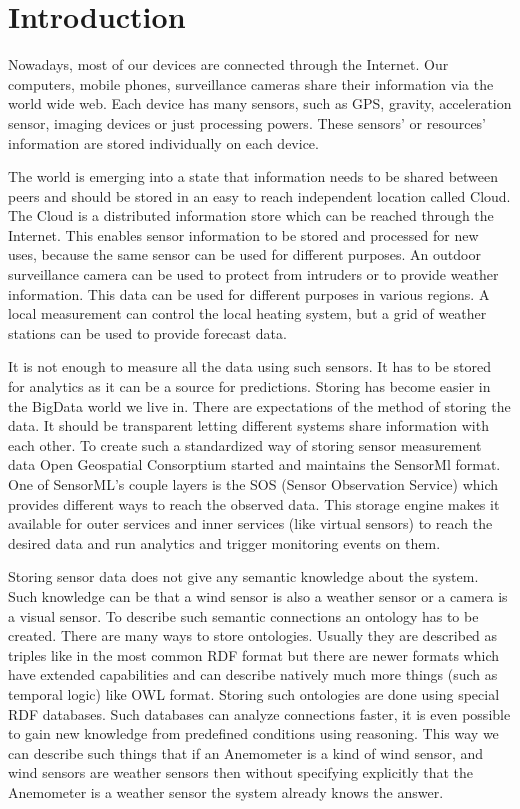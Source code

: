 \chapter*{Introduction}

Nowadays, most of our devices are connected through the Internet. Our computers, mobile phones, surveillance cameras share their information via the world wide web. Each device has many sensors, such as GPS, gravity, acceleration sensor, imaging devices or just processing powers. These sensors' or resources' information are stored individually on each device. 

The world is emerging into a state that information needs to be shared between peers and should be stored in an easy to reach independent location called Cloud. The Cloud is a distributed information store which can be reached through the Internet.
This enables sensor information to be stored and processed for new uses, because the same sensor can be used for different purposes. An outdoor surveillance camera can be used to protect from intruders or to provide weather information. This data can be used for different purposes in various regions. A local measurement can control the local heating system, but a grid of weather stations can be used to provide forecast data.
 
 It is not enough to measure all the data using such sensors. It has to be stored for analytics as it can be a source for predictions. Storing has become easier in the BigData world we live in. There are expectations of the method of storing the data. It should be transparent letting different systems share information with each other. To create such a standardized way of storing sensor measurement data Open Geospatial Consorptium started and maintains the SensorMl format. One of SensorML's couple layers is the SOS (Sensor Observation Service) which provides different ways to reach the observed data. This storage engine makes it available for outer services and inner services (like virtual sensors) to reach the desired data and run analytics and trigger monitoring events on them.

Storing sensor data does not give any semantic knowledge about the system. Such knowledge can be that a wind sensor is also a weather sensor or a camera is a visual sensor. To describe such semantic connections an ontology has to be created. There are many ways to store ontologies. Usually they are described as triples like in the most common RDF format but there are newer formats which have extended capabilities and can describe natively much more things (such as temporal logic) like OWL format. Storing such ontologies are done using special RDF databases. Such databases can analyze connections faster, it is even possible to gain new knowledge from predefined conditions using reasoning. This way we can describe such things that if an Anemometer is a kind of wind sensor, and wind sensors are weather sensors then without specifying explicitly that the Anemometer is a weather sensor the system already knows the answer. 

